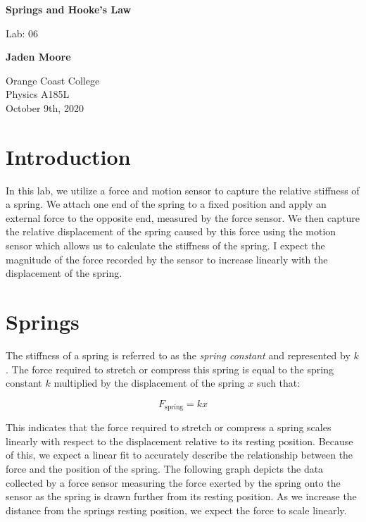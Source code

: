 \documentclass[12pt]{article}
\begin{document}

\begin{titlepage}
    \begin{center}
        \vspace*{1cm}
        \textbf{Springs and Hooke's Law}

        \vspace{0.5cm}
        Lab: 06

        \vspace{1cm}

        \textbf{Jaden Moore}

        \vfill

        Orange Coast College\\
        Physics A185L\\
        October 9th, 2020

    \end{center}
\end{titlepage}

\pagestyle{fancy}
\fancyhf{}
\setlength{\headheight}{15pt}
\cfoot{\thepage}

\section{Introduction}
In this lab, we utilize a force and motion sensor to capture the relative stiffness of a spring. We attach one end of the spring to a fixed position and apply an external force to the opposite end, measured by the force sensor. We then capture the relative displacement of the spring caused by this force using the motion sensor which allows us to calculate the stiffness of the spring. I expect the magnitude of the force recorded by the sensor to increase linearly with the displacement of the spring.

\section{Springs}
The stiffness of a spring is referred to as the \textit{spring constant} and represented by $k$. The force required to stretch or compress this spring is equal to the spring constant $k$ multiplied by the displacement of the spring $x$ such that:

\[F_\text{spring} = kx\]

This indicates that the force required to stretch or compress a spring scales linearly with respect to the displacement relative to its resting position. Because of this, we expect a linear fit to accurately describe the relationship between the force and the position of the spring. The following graph depicts the data collected by a force sensor measuring the force exerted by the spring onto the sensor as the spring is drawn further from its resting position. As we increase the distance from the springs resting position, we expect the force to scale linearly.
\end{document}
